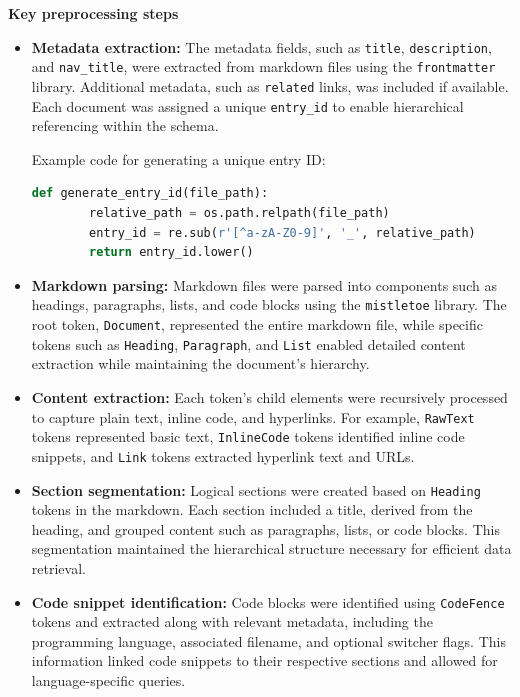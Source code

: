 \textbf{Key preprocessing steps}

\begin{itemize}
	\item \textbf{Metadata extraction:} 
	The metadata fields, such as \texttt{title}, \texttt{description}, and \texttt{nav\_title}, were extracted from markdown files using the \texttt{frontmatter} library. Additional metadata, such as \texttt{related} links, was included if available. Each document was assigned a unique \texttt{entry\_id} to enable hierarchical referencing within the schema.
	
	Example code for generating a unique entry ID:
	\begin{lstlisting}[language=Python, caption=Generating Unique Entry IDs]
		def generate_entry_id(file_path):
		relative_path = os.path.relpath(file_path)
		entry_id = re.sub(r'[^a-zA-Z0-9]', '_', relative_path)
		return entry_id.lower()
	\end{lstlisting}
	
	\item \textbf{Markdown parsing:} 
	Markdown files were parsed into components such as headings, paragraphs, lists, and code blocks using the \texttt{mistletoe} library. The root token, \texttt{Document}, represented the entire markdown file, while specific tokens such as \texttt{Heading}, \texttt{Paragraph}, and \texttt{List} enabled detailed content extraction while maintaining the document's hierarchy.
	
	\item \textbf{Content extraction:} 
	Each token's child elements were recursively processed to capture plain text, inline code, and hyperlinks. For example, \texttt{RawText} tokens represented basic text, \texttt{InlineCode} tokens identified inline code snippets, and \texttt{Link} tokens extracted hyperlink text and URLs.
	
	\item \textbf{Section segmentation:} 
	Logical sections were created based on \texttt{Heading} tokens in the markdown. Each section included a title, derived from the heading, and grouped content such as paragraphs, lists, or code blocks. This segmentation maintained the hierarchical structure necessary for efficient data retrieval.
	
	\item \textbf{Code snippet identification:} 
	Code blocks were identified using \texttt{CodeFence} tokens and extracted along with relevant metadata, including the programming language, associated filename, and optional switcher flags. This information linked code snippets to their respective sections and allowed for language-specific queries.
	

\end{itemize}
